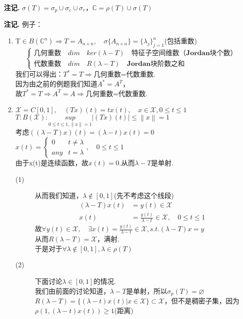 \documentclass[12pt, a4paper, oneside]{ctexbook}
\newenvironment{note}{\par\noindent\textbf{注记. }}{\par}
\begin{document}
\begin{note}
$\sigma(T)=\sigma_p\cup \sigma_c\cup \sigma_r$，$\mathbb{C}=\rho(T)\cup\sigma(T)$
\end{note}
\begin{note}
例子：\begin{enumerate}
	\item  T$\in B(\mathbb{C}^n)\Rightarrow T=A_{n\times n},\quad \sigma\{A_{n\times n}\}=\{\lambda _j\}_{j=1}^n$(包括重数)\begin{equation*}
		\left\{\begin{matrix}
			\textbf{几何重数} \quad dim\quad ker(\lambda-T) \quad \textbf{特征子空间维数（Jordan块个数）}\\ 
			\textbf{代数重数} \quad dim \quad R(\lambda-T) \quad \textbf{Jordan块阶数之和}
		\end{matrix}\right.
	\end{equation*}
我们可以得出：$T^*=T\Rightarrow $几何重数=代数重数.\\
因为由之前的例题我们知道$A^*=A^T$，\\
故$T^*=T \Rightarrow A^T=A\Rightarrow $几何重数=代数重数.\\

\item $\mathscr{X}=C[0,1],\quad (Tx)(t)=tx(t),\quad x\in \mathscr{X},0\leqslant t\leqslant 1$\\
$T:B(\mathscr{X}):\underset{0\leqslant t \leqslant 1,\left \| x\right \|=1}{sup}\left | (Tx)(t)\right | \leqslant \left \| x\right \|=1$\\
考虑$((\lambda-T)x)(t)=(\lambda-t)x(t)=0$\\
$x(t)=\left\{\begin{matrix}
	0 &t\neq \lambda \\ 
	any & t=\lambda 
\end{matrix}\right.
,\quad 0\leqslant t \leqslant 1$\\
由于x(t)是连续函数，故$x(t)=0$.从而$\lambda-T$是单射.\\
\begin{description}
	\item[(1)] 从而我们知道，$\lambda \notin [0,1]$(先不考虑这个线段)\begin{align*}
		(\lambda-T)x(t)&=y(t)\in \mathscr{X}\\
		x(t)&=\frac{y(t)}{\lambda-t}\in \mathscr{X},\quad 0\leqslant t \leqslant 1
	\end{align*} 
故$\forall y(t)\in \mathscr{X},\quad \exists x(t)=\frac{y(t)}{\lambda-t}\in \mathscr{X},s.t. (\lambda-T)x=y$\\
从而$R(\lambda-T)=\mathscr{X}$，满射.\\
于是对于$\forall \lambda \notin [0,1],\lambda\in \rho(T)$
\item[(2)]  下面讨论$\lambda \in [0,1]$的情况.\\
我们由前面的讨论知道，$\lambda-T$是单射，所以$\sigma_p(T)=\varnothing $\\
$R(\lambda-T)=\{(\lambda-t)x(t)|x\in \mathscr{X}\}\subset \mathscr{X}$，但不是稠密子集，因为$\rho(1,(\lambda-t)x(t))\geqslant 1$(距离)
\end{description}
\end{enumerate}
\end{note}
\end{document}
